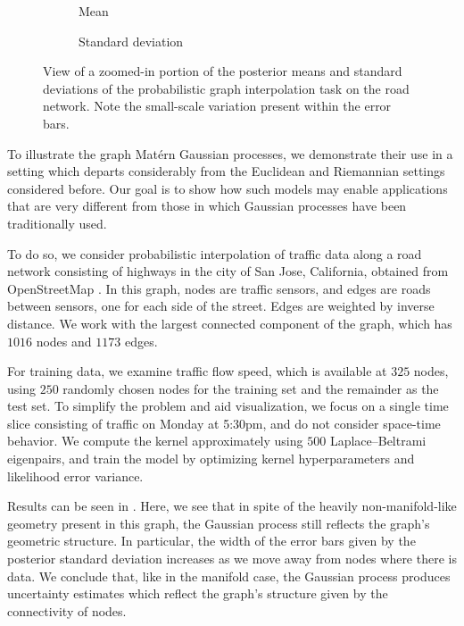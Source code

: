 \documentclass[11pt]{book}
\begin{document}
\begin{figure}
\begin{subfigure}{0.49\textwidth}

\caption{Mean}
\end{subfigure}
\begin{subfigure}{0.49\textwidth}

\caption{Standard deviation}
\end{subfigure}
\caption[Posterior Gaussian process: traffic data, local view]{View of a zoomed-in portion of the posterior means and standard deviations of the probabilistic graph interpolation task on the road network. Note the small-scale variation present within the error bars.}
\label{fig:graph-posterior-zoom}
\end{figure}

To illustrate the graph Matérn Gaussian processes, we demonstrate their use in a setting which departs considerably from the Euclidean and Riemannian settings considered before.
Our goal is to show how such models may enable applications that are very different from those in which Gaussian processes have been traditionally used.

To do so, we consider probabilistic interpolation of traffic data along a road network consisting of highways in the city of San Jose, California, obtained from OpenStreetMap \cite{osm17}.
In this graph, nodes are traffic sensors, and edges are roads between sensors, one for each side of the street.
Edges are weighted by inverse distance.
We work with the largest connected component of the graph, which has $1016$ nodes and $1173$ edges.

For training data, we examine traffic flow speed, which is available at $325$ nodes, using $250$ randomly chosen nodes for the training set and the remainder as the test set.
To simplify the problem and aid visualization, we focus on a single time slice consisting of traffic on Monday at 5:30pm, and do not consider space-time behavior.
We compute the kernel approximately using $500$ Laplace--Beltrami eigenpairs, and train the model by optimizing kernel hyperparameters and likelihood error variance.

Results can be seen in .
Here, we see that in spite of the heavily non-manifold-like geometry present in this graph, the Gaussian process still reflects the graph's geometric structure.
In particular, the width of the error bars given by the posterior standard deviation increases as we move away from nodes where there is data.
We conclude that, like in the manifold case, the Gaussian process produces uncertainty estimates which reflect the graph's structure given by the connectivity of nodes.
\end{document}
